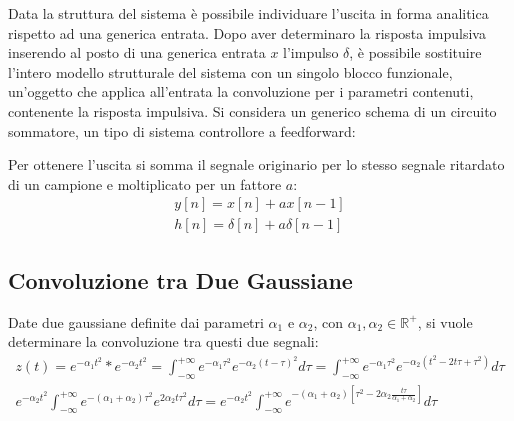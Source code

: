\documentclass{article}
\numberwithin{equation}{subsection}
\begin{document}
Data la struttura del sistema è possibile individuare l'uscita in forma analitica rispetto ad una generica entrata. Dopo aver determinaro la risposta impulsiva inserendo 
al posto di una generica entrata $x$ l'impulso $\delta$, è possibile sostituire l'intero modello strutturale del sistema con un singolo blocco funzionale, un'oggetto che 
applica all'entrata la convoluzione per i parametri contenuti, contenente la risposta impulsiva.  
Si considera un generico schema di un circuito sommatore, un tipo di sistema controllore a feedforward:
\begin{center}
\end{center}
Per ottenere l'uscita si somma il segnale originario per lo stesso segnale ritardato di un campione e moltiplicato per un fattore $a$:
\begin{gather*}
    y[n]=x[n]+ax[n-1]\\
    h[n]=\delta[n]+a\delta[n-1]
\end{gather*}
\begin{center}
\end{center}

\subsection{Convoluzione tra Due Gaussiane}

Date due gaussiane definite dai parametri $\alpha_1$ e $\alpha_2$, con $\alpha_1,\alpha_2\in\mathbb{R}^+$, si vuole determinare la convoluzione tra questi due segnali:
\begin{gather*}
    z(t)=e^{-\alpha_1t^2}*e^{-\alpha_2t^2}=\displaystyle\int_{-\infty}^{+\infty}e^{-\alpha_1\tau^2}e^{-\alpha_2(t-\tau)^2}d\tau=\int_{-\infty}^{+\infty}e^{-\alpha_1\tau^2}e^{-\alpha_2(t^2-2t\tau+\tau^2)}d\tau\\
    \displaystyle e^{-\alpha_2 t^2}\int_{-\infty}^{+\infty}e^{-(\alpha_1+\alpha_2)\tau^2}e^{2\alpha_2t\tau^2}d\tau=e^{-\alpha_2 t^2}\int_{-\infty}^{+\infty}e^{-(\alpha_1+\alpha_2)\left[\tau^2-2\alpha_2\frac{t\tau}{\alpha_1+\alpha_2}\right]}d\tau
\end{gather*}
\end{document}
